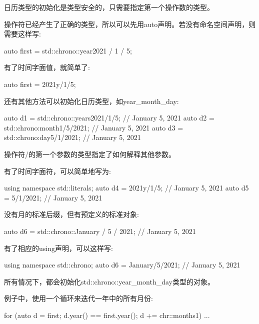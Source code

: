 日历类型的初始化是类型安全的，只需要指定第一个操作数的类型。

操作符已经产生了正确的类型，所以可以先用auto声明。若没有命名空间声明，则需要这样写:

\begin{cpp}
auto first = std::chrono::year{2021} / 1 / 5;
\end{cpp}

有了时间字面值，就简单了:

\begin{cpp}
auto first = 2021y/1/5;
\end{cpp}


还有其他方法可以初始化日历类型，如year\_month\_day:

\begin{cpp}
auto d1 = std::chrono::years{2021}/1/5; // January 5, 2021
auto d2 = std::chrono:month{1}/5/2021; // January 5, 2021
auto d3 = std::chrono:day{5}/1/2021; // January 5, 2021
\end{cpp}

操作符/的第一个参数的类型指定了如何解释其他参数。

有了时间字面符，可以简单地写为:

\begin{cpp}
using namespace std::literals;
auto d4 = 2021y/1/5; // January 5, 2021
auto d5 = 5/1/2021; // January 5, 2021
\end{cpp}

没有月的标准后缀，但有预定义的标准对象:

\begin{cpp}
auto d6 = std::chrono::January / 5 / 2021; // January 5, 2021
\end{cpp}

有了相应的using声明，可以这样写:

\begin{cpp}
using namespace std::chrono;
auto d6 = January/5/2021; // January 5, 2021
\end{cpp}

所有情况下，都会初始化std::chrono::year\_month\_day类型的对象。


例子中，使用一个循环来迭代一年中的所有月份:

\begin{cpp}
for (auto d = first; d.year() == first.year(); d += chr::months{1}) {
	...
}
\end{cpp}

